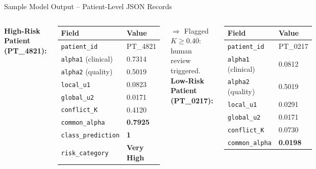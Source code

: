 \documentclass[aspectratio=169]{beamer}
\begin{document}
\begin{frame}[fragile]{Sample Model Output -- Patient-Level JSON Records}
  \begin{columns}[T]
      \textbf{\color{red!70!black}High-Risk Patient (PT\_4821):}
      \begin{center}\scriptsize
      \begin{tabular}{@{}ll@{}}
        \toprule
        \textbf{Field} & \textbf{Value} \\
        \midrule
        \texttt{patient\_id}           & PT\_4821 \\
        \texttt{alpha1} (clinical)     & 0.7314 \\
        \texttt{alpha2} (quality)      & 0.5019 \\
        \texttt{local\_u1}             & 0.0823 \\
        \texttt{global\_u2}            & 0.0171 \\
        \texttt{conflict\_K}           & 0.4120 \\
        \texttt{common\_alpha}         & \textbf{0.7925} \\
        \texttt{class\_prediction}     & \textbf{1} \\
        \texttt{risk\_category}        & \textbf{Very High} \\
        \bottomrule
      \end{tabular}
      \end{center}
      {\color{red!70!black}\small $\Rightarrow$ Flagged $K\geq0.40$: human review triggered.}
      \textbf{\color{teal!80!black}Low-Risk Patient (PT\_0217):}
      \begin{center}\scriptsize
      \begin{tabular}{@{}ll@{}}
        \toprule
        \textbf{Field} & \textbf{Value} \\
        \midrule
        \texttt{patient\_id}           & PT\_0217 \\
        \texttt{alpha1} (clinical)     & 0.0812 \\
        \texttt{alpha2} (quality)      & 0.5019 \\
        \texttt{local\_u1}             & 0.0291 \\
        \texttt{global\_u2}            & 0.0171 \\
        \texttt{conflict\_K}           & 0.0730 \\
        \texttt{common\_alpha}         & \textbf{0.0198} \\

\end{tabular}
\end{center}
\end{columns}
\end{frame}
\end{document}
